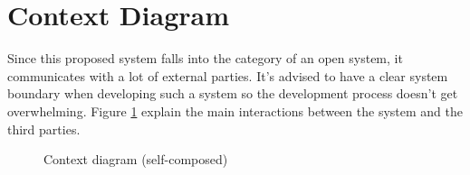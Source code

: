 \section{Context Diagram}

Since this proposed system falls into the category of an open system, it communicates with a lot of external parties. It's advised to have a clear system boundary when developing such a system so the development process doesn't get overwhelming. Figure \ref{fig:context-digram} explain the main interactions between the system and the third parties.

\begin{figure}[H]
    \setlength{\fboxsep}{10pt}
    \caption{Context diagram (self-composed)}
    \label{fig:context-digram}
\end{figure}
